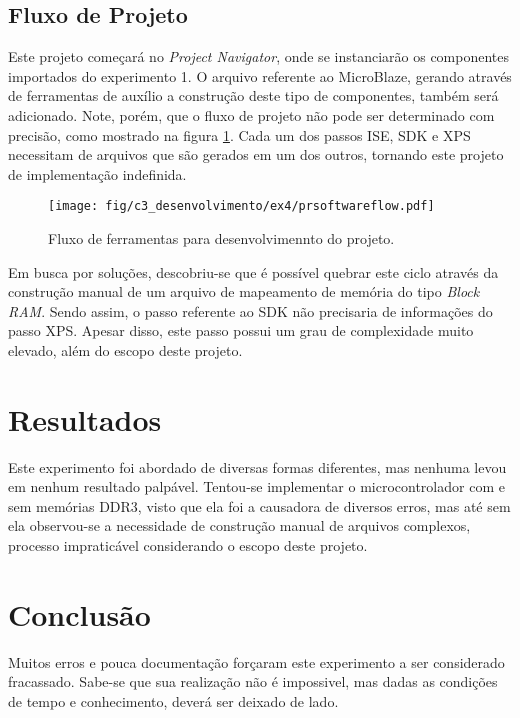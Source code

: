 \documentclass[11pt,a4paper,oneside]{book}
\begin{document}
\subsection{Fluxo de Projeto}
Este projeto começará no \textit{Project Navigator}, onde se instanciarão os componentes importados do experimento 1.
O arquivo referente ao MicroBlaze, gerando através de ferramentas de auxílio a construção deste tipo de componentes, também será adicionado.
Note, porém, que o fluxo de projeto não pode ser determinado com precisão, como mostrado na figura \ref{fig:ex4:prsoftwareflow}.
Cada um dos passos ISE, SDK e XPS necessitam de arquivos que são gerados em um dos outros, tornando este projeto de implementação indefinida.

\begin{figure}[htp]
\centering
\texttt{[image: fig/c3\_desenvolvimento/ex4/prsoftwareflow.pdf]}
\caption{Fluxo de ferramentas para desenvolvimennto do projeto.}
\label{fig:ex4:prsoftwareflow}
\end{figure}

Em busca por soluções, descobriu-se que é possível quebrar este ciclo através da construção manual de um arquivo de mapeamento de memória do tipo \textit{Block RAM}.
Sendo assim, o passo referente ao SDK não precisaria de informações do passo XPS.
Apesar disso, este passo possui um grau de complexidade muito elevado, além do escopo deste projeto.

\section{Resultados}
Este experimento foi abordado de diversas formas diferentes, mas nenhuma levou em nenhum resultado palpável.
Tentou-se implementar o microcontrolador com e sem memórias DDR3, visto que ela foi a causadora de diversos erros, mas até sem ela observou-se a necessidade de construção manual de arquivos complexos, processo impraticável considerando o escopo deste projeto.

\section{Conclusão}
Muitos erros e pouca documentação forçaram este experimento a ser considerado fracassado.
Sabe-se que sua realização não é impossivel, mas dadas as condições de tempo e conhecimento, deverá ser deixado de lado.

\end{document}
